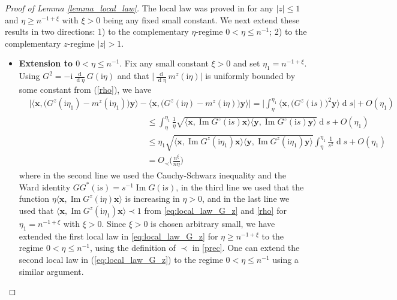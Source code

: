 \documentclass[10pt,reqno]{amsart}
\numberwithin{equation}{section}
\numberwithin{figure}{section}
\theoremstyle{plain}
\newcommand{\ii}{\mathrm{i}}
\newcommand{\<}{\langle}
\renewcommand{\>}{\rangle}
\newcommand{\dd}{\operatorname{d}\!{}}
\renewcommand{\Im}{\operatorname{Im}}
\begin{document}
     
     \begin{proof}[Proof of Lemma \ref{lemma_local_law}] The local law was proved in \cite[Eq. (4.17)-(4.18)]{chafai-garcia-zelada-xu} for any $|z|\leq 1$ and $\eta \geq n^{-1+\xi}$ with $\xi>0$ being any fixed small constant. We next extend these results in two directions: 1) to the complementary $\eta$-regime $0 <\eta \leq n^{-1}$; 2) to the complementary $z$-regime $|z|>1$.
     \begin{itemize}
     \item[(1)] \textbf{Extension to $0< \eta \leq  n^{-1}$}. Fix any small constant $\xi>0$ and set $\eta_1=n^{-1+\xi}$. Using $G^2=-\ii \frac{\dd}{\dd \eta} G(\ii \eta)$ and that $\Big|\frac{\dd}{\dd \eta}m^z(\ii \eta)\Big|$ is uniformly bounded by some constant from (\ref{rho}), we have
     \begin{align}
		&\Big|\big\langle \mathbf{x}, \big(G^z(\ii \eta_1)-m^z(\ii \eta_1)\big)\mathbf{y} \big\rangle-\big\langle \mathbf{x}, \big(G^z(\ii \eta)-m^z(\ii \eta)\big)\mathbf{y} \big\rangle\Big|=\Big|\int_{\eta}^{\eta_1} \big\langle \mathbf{x}, \big(G^z(\ii s)\big)^2\mathbf{y} \big\rangle \dd s \Big|+O(\eta_1)\\
		& \qquad\qquad \qquad \qquad \qquad\qquad \qquad  \leq  \int_{\eta}^{\eta_1} \frac{1}{\eta}\sqrt{\big\langle \mathbf{x}, \Im G^z(\ii s) \mathbf{x} \big\rangle\big\langle \mathbf{y}, \Im G^z(\ii s) \mathbf{y} \big\rangle}   \dd s+O(\eta_1)\\
        &\qquad\qquad \qquad \qquad \qquad \qquad \qquad\leq  \eta_1 \sqrt{\big\langle \mathbf{x}, \Im G^z(\ii \eta_1) \mathbf{x} \big\rangle\big\langle \mathbf{y}, \Im G^z(\ii \eta_1) \mathbf{y} \big\rangle} \int_{\eta}^{\eta_1} \frac{1}{s^2} \dd s+O(\eta_1)\\
        &\qquad\qquad \qquad \qquad \qquad \qquad \qquad =O_\prec\Big( \frac{n^{\xi}}{n\eta}\Big)
	\end{align}
    where in the second line we used the Cauchy-Schwarz inequality and the Ward identity $GG^*(\ii s)=s^{-1}\Im G(\ii s)$, in the third line we used that the function $\eta \big\langle \mathbf{x}, \Im G^z(\ii \eta) \mathbf{x} \big\rangle$ is increasing in $\eta>0$, and in the last line we used that $\big\langle \mathbf{x}, \Im G^z(\ii \eta_1) \mathbf{x} \big\rangle \prec 1$ from \eqref{eq:local_law_G_z} and \eqref{rho} for $\eta_1=n^{-1+\xi}$ with $\xi>0$.  Since $\xi>0$ is chosen arbitrary small,  we have extended the first local law in \eqref{eq:local_law_G_z} for $\eta\geq n^{-1+\xi}$ to the regime $0< \eta \leq n^{-1}$, using the definition of $\prec$ in \eqref{prec}. One can extend the second local law  in (\ref{eq:local_law_G_z}) to the regime $0< \eta \leq n^{-1}$ using a similar argument. 
    

\end{itemize}
\end{proof}
\end{document}
